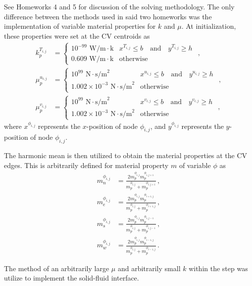 \documentclass{article}
\begin{document}
See Homeworks 4 and 5 for discussion of the solving methodology. The only difference between the methods used in said two homeworks was the implementation of variable material properties for $k$ and $\mu$. At initialization, these properties were set at the CV centroids as
\begin{align}
	k_p^{T_{i,j}} & =
	\begin{cases}
		10^{-99} \text{~W/m}\cdot\text{k} & x^{T_{i,j}} \leq b \quad \text{and} \quad y^{T_{i,j}} \geq h\ \\
		0.609 \text{~W/m}\cdot\text{k} & \text{otherwise}
	\end{cases}\,, \\
	\mu_p^{u_{i,j}} & =
	\begin{cases}
		10^{99} \text{~N}\cdot\text{s/m}^2 & x^{u_{i,j}} \leq b \quad \text{and} \quad y^{u_{i,j}} \geq h\ \\
		1.002 \times 10^{-3} \text{~N}\cdot\text{s/m}^2 & \text{otherwise}
	\end{cases}\,,\\
	\mu_p^{v_{i,j}} & =
	\begin{cases}
		10^{99} \text{~N}\cdot\text{s/m}^2 & x^{v_{i,j}} \leq b \quad \text{and} \quad y^{v_{i,j}} \geq h\ \\
		1.002 \times 10^{-3} \text{~N}\cdot\text{s/m}^2 & \text{otherwise}
	\end{cases}\,,
\end{align}
where $x^{\phi_{i,j}}$ represents the $x$-position of node $\phi_{i,j}$, and $y^{\phi_{i,j}}$ represents the $y$-position of node $\phi_{i,j}$.

The harmonic mean is then utilized to obtain the material properties at the CV edges. This is arbitrarily defined for material property $m$ of variable $\phi$ as
\begin{align}
	m_n^{\phi_{i,j}} & = \frac{2 m_p^{\phi_{i,j}} m_p^{\phi_{i,j+1}}}{m_p^{\phi_{i,j}} + m_p^{\phi_{i,j+1}}}\,,\\
	m_e^{\phi_{i,j}} & = \frac{2 m_p^{\phi_{i,j}} m_p^{\phi_{i+1,j}}}{m_p^{\phi_{i,j}} + m_p^{\phi_{i+1,j}}}\,,\\
	m_s^{\phi_{i,j}} & = \frac{2 m_p^{\phi_{i,j}} m_p^{\phi_{i,j-1}}}{m_p^{\phi_{i,j}} + m_p^{\phi_{i,j-1}}}\,,\\
	m_w^{\phi_{i,j}} & = \frac{2 m_p^{\phi_{i,j}} m_p^{\phi_{i-1,j}}}{m_p^{\phi_{i,j}} + m_p^{\phi_{i-1,j}}}\,.
\end{align}

The method of an arbitrarily large $\mu$ and arbitrarily small $k$ within the step was utilize to implement the solid-fluid interface.
\end{document}
